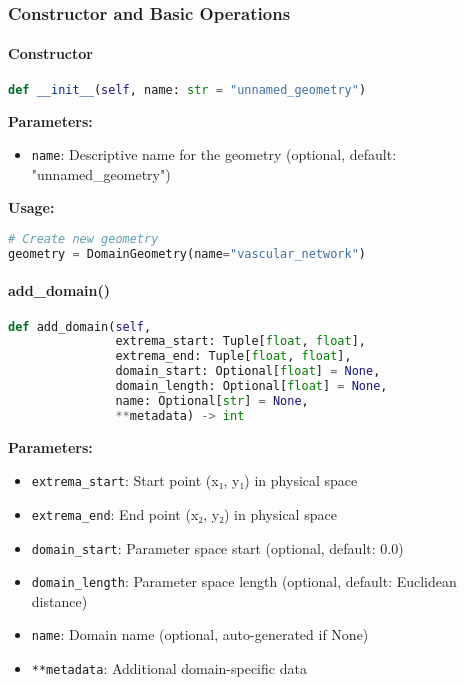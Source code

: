 \subsubsection{Constructor and Basic Operations}

\paragraph{Constructor}
\begin{lstlisting}[language=Python, caption=DomainGeometry Constructor]
def __init__(self, name: str = "unnamed_geometry")
\end{lstlisting}

\textbf{Parameters:}
\begin{itemize}
    \item \texttt{name}: Descriptive name for the geometry (optional, default: "unnamed\_geometry")
\end{itemize}

\textbf{Usage:}
\begin{lstlisting}[language=Python]
# Create new geometry
geometry = DomainGeometry(name="vascular_network")
\end{lstlisting}

\paragraph{add\_domain()}
\begin{lstlisting}[language=Python, caption=Add Domain Method]
def add_domain(self, 
               extrema_start: Tuple[float, float],
               extrema_end: Tuple[float, float],
               domain_start: Optional[float] = None,
               domain_length: Optional[float] = None,
               name: Optional[str] = None,
               **metadata) -> int
\end{lstlisting}

\textbf{Parameters:}
\begin{itemize}
    \item \texttt{extrema\_start}: Start point (x₁, y₁) in physical space
    \item \texttt{extrema\_end}: End point (x₂, y₂) in physical space
    \item \texttt{domain\_start}: Parameter space start (optional, default: 0.0)
    \item \texttt{domain\_length}: Parameter space length (optional, default: Euclidean distance)
    \item \texttt{name}: Domain name (optional, auto-generated if None)
    \item \texttt{**metadata}: Additional domain-specific data
\end{itemize}

